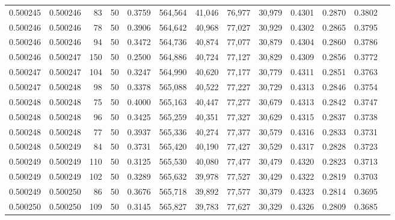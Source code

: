 \begin{tabular}{rrrrrrrrrrrrr}
0.500245 & 0.500246 &    83 &  50 &                                     0.3759 & 564,564 &  41,046 &  76,977 &  30,979 & 0.4301 & 0.2870 & 0.3802 \\
0.500246 & 0.500246 &    78 &  50 &                                     0.3906 & 564,642 &  40,968 &  77,027 &  30,929 & 0.4302 & 0.2865 & 0.3795 \\
0.500246 & 0.500246 &    94 &  50 &                                     0.3472 & 564,736 &  40,874 &  77,077 &  30,879 & 0.4304 & 0.2860 & 0.3786 \\
0.500246 & 0.500247 &   150 &  50 &                                     0.2500 & 564,886 &  40,724 &  77,127 &  30,829 & 0.4309 & 0.2856 & 0.3772 \\
0.500247 & 0.500247 &   104 &  50 &                                     0.3247 & 564,990 &  40,620 &  77,177 &  30,779 & 0.4311 & 0.2851 & 0.3763 \\
0.500247 & 0.500248 &    98 &  50 &                                     0.3378 & 565,088 &  40,522 &  77,227 &  30,729 & 0.4313 & 0.2846 & 0.3754 \\
0.500248 & 0.500248 &    75 &  50 &                                     0.4000 & 565,163 &  40,447 &  77,277 &  30,679 & 0.4313 & 0.2842 & 0.3747 \\
0.500248 & 0.500248 &    96 &  50 &                                     0.3425 & 565,259 &  40,351 &  77,327 &  30,629 & 0.4315 & 0.2837 & 0.3738 \\
0.500248 & 0.500248 &    77 &  50 &                                     0.3937 & 565,336 &  40,274 &  77,377 &  30,579 & 0.4316 & 0.2833 & 0.3731 \\
0.500248 & 0.500249 &    84 &  50 &                                     0.3731 & 565,420 &  40,190 &  77,427 &  30,529 & 0.4317 & 0.2828 & 0.3723 \\
0.500249 & 0.500249 &   110 &  50 &                                     0.3125 & 565,530 &  40,080 &  77,477 &  30,479 & 0.4320 & 0.2823 & 0.3713 \\
0.500249 & 0.500249 &   102 &  50 &                                     0.3289 & 565,632 &  39,978 &  77,527 &  30,429 & 0.4322 & 0.2819 & 0.3703 \\
0.500249 & 0.500250 &    86 &  50 &                                     0.3676 & 565,718 &  39,892 &  77,577 &  30,379 & 0.4323 & 0.2814 & 0.3695 \\
0.500250 & 0.500250 &   109 &  50 &                                     0.3145 & 565,827 &  39,783 &  77,627 &  30,329 & 0.4326 & 0.2809 & 0.3685 \\

\end{tabular}
